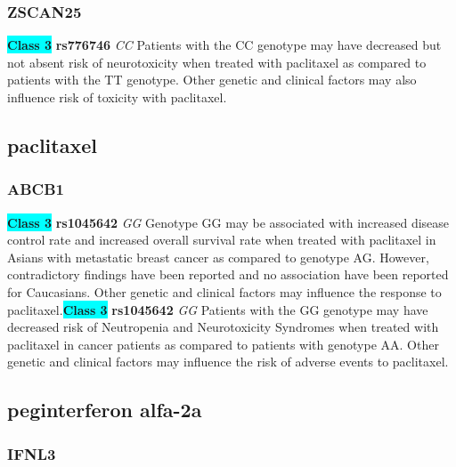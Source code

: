 \documentclass{book}
\begin{document}
\subsubsection{ ZSCAN25 }

\begin{center}
\textbf{\colorbox{cyan} {Class 3}} \textbf{ rs776746 } \textit{ CC }
Patients with the CC genotype may have decreased but not absent risk of neurotoxicity when treated with paclitaxel as compared to patients with the TT genotype. Other genetic and clinical factors may also influence risk of toxicity with paclitaxel.


\end{center}\subsection{ paclitaxel }


\subsubsection{ ABCB1 }

\begin{center}
\textbf{\colorbox{cyan} {Class 3}} \textbf{ rs1045642 } \textit{ GG }
Genotype GG may be associated with increased disease control rate and increased overall survival rate when treated with paclitaxel in Asians with metastatic breast cancer as compared to genotype AG. However, contradictory findings have been reported and no association have been reported for Caucasians. Other genetic and clinical factors may influence the response to paclitaxel.\textbf{\colorbox{cyan} {Class 3}} \textbf{ rs1045642 } \textit{ GG }
Patients with the GG genotype may have decreased risk of Neutropenia and Neurotoxicity Syndromes when treated with paclitaxel in cancer patients as compared to patients with genotype AA. Other genetic and clinical factors may influence the risk of adverse events to paclitaxel.


\end{center}\subsection{ peginterferon alfa-2a }


\subsubsection{ IFNL3 }
\end{document}
